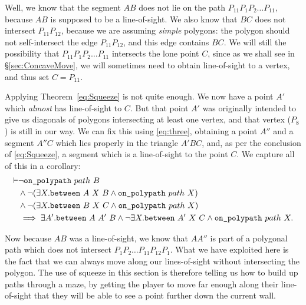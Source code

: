 Well, we know that the segment $AB$ does not lie on the path $P_{11}P_1P_2\ldots P_{11}$, because $AB$ is supposed to be a line-of-sight. We also know that $BC$ does not intersect $P_{11}P_{12}$, because we are assuming \emph{simple} polygons: the polygon should not self-intersect the edge $P_{11}P_{12}$, and this edge contains $BC$. We will still the possibility that $P_{11}P_1P_2\ldots P_{11}$ intersects the lone point $C$, since as we shall see in \S\ref{sec:ConcaveMove}, we will sometimes need to obtain line-of-sight to a vertex, and thus set $C=P_{11}$.

Applying Theorem~\ref{eq:Squeeze} is not quite enough. We now have a point $A'$ which \emph{almost} has line-of-sight to $C$. But that point $A'$ was originally intended to give us diagonals of polygons intersecting at least one vertex, and that vertex ($P_8$) is still in our way. We can fix this using \ref{eq:three}, obtaining a point $A''$ and a segment $A''C$ which lies properly in the triangle $A'BC$, and, as per the conclusion of \eqref{eq:Squeeze}, a segment which is a line-of-sight to the point $C$. We capture all of this in a corollary:
\begin{equation}\label{eq:Squeeze2}
  \begin{aligned}
\vdash    &\neg\texttt{on\_polypath}\ path\ B\\
    &\wedge \neg(\exists X. \texttt{between}\ A\ X\ B \wedge \texttt{on\_polypath}\ path\ X)\\
    &\wedge \neg(\exists X. \texttt{between}\ B\ X\ C \wedge \texttt{on\_polypath}\ path\ X)\\
    &\implies \exists A'. \texttt{between}\ A\ A'\ B \wedge \neg\exists X. \texttt{between}\ A'\ X\ C \wedge \texttt{on\_polypath}\ path\ X.
  \end{aligned}
\end{equation}

Now because $AB$ was a line-of-sight, we know that $AA''$ is part of a polygonal path which does not intersect $P_1P_2\ldots P_{11}P_{12}P_{1}$. What we have exploited here is the fact that we can always move along our lines-of-sight without intersecting the polygon. The use of squeeze in this section is therefore telling us how to build up paths through a maze, by getting the player to move far enough along their line-of-sight that they will be able to see a point further down the current wall. 

